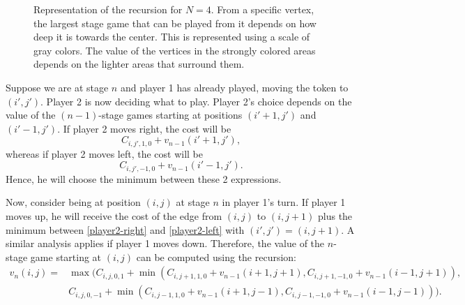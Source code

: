 \begin{figure}[!hbt]
            \caption{Representation of the recursion for $N = 4$. From a specific vertex, the largest stage game that can be played from it depends on how deep it is towards the center. This is represented using a scale of gray colors. The value of the vertices in the strongly colored areas depends on the lighter areas that surround them.}
        \end{figure} 

        Suppose we are at stage $n$ and player 1 has already played, moving the token to $(i', j')$. Player 2 is now deciding what to play. Player 2's choice depends on the value of the $(n-1)$-stage games starting at positions $(i'+ 1, j')$ and $(i'-1, j')$. If player 2 moves right, the cost will be
        \begin{equation}\label{player2-right}
            C_{i, j', 1, 0} + v_{n-1}(i'+1, j'),
        \end{equation}
        whereas if player 2 moves left, the cost will be 
        \begin{equation}\label{player2-left}
            C_{i, j', -1, 0} + v_{n-1}(i'-1, j').
        \end{equation}
        Hence, he will choose the minimum between these 2 expressions. 

        Now, consider being at position $(i, j)$ at stage $n$ in player 1's turn. If player 1 moves up, he will receive the cost of the edge from $(i, j)$ to $(i, j + 1)$ plus the minimum between \eqref{player2-right} and \eqref{player2-left} with $(i', j') = (i, j+1)$. A similar analysis applies if player 1 moves down. Therefore, the value of the $n$-stage game starting at $(i, j)$ can be computed using the recursion: 
        \begin{align*}   
            v_n(i, j) = & \max (C_{i, j, 0, 1} + \min (C_{i, j+1, 1, 0} + v_{n-1}(i+1, j+1), C_{i, j+1, -1, 0} + v_{n-1}(i-1, j+1)), \\
                        & C_{i, j, 0, -1} + \min (C_{i, j-1, 1, 0} + v_{n-1}(i+1, j-1), C_{i, j-1, -1, 0} + v_{n-1}(i-1, j-1))).
        \end{align*}

